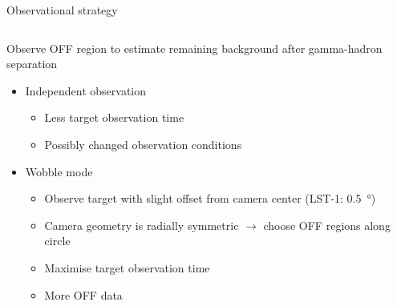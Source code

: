 \begin{frame}{Observational strategy}
    \begin{columns}[onlytextwidth]
        \begin{column}{0.6\textwidth}
            Observe OFF region to estimate remaining background after gamma-hadron separation
            \begin{itemize}
                \item<1-> Independent observation
                    \begin{itemize}
                        \item[\textbf{\textcolor{tugreen}{\to}}] Less target observation time
                        \item[\textbf{\textcolor{tugreen}{\to}}] Possibly changed observation conditions
                    \end{itemize}
                \item<2-> Wobble mode
                    \begin{itemize}
                        \item Observe target with slight offset from camera center (LST-1: \SI{0.5}{\degree})
                        \item Camera geometry is radially symmetric $\to$ choose OFF regions along circle
                        \item[\textbf{\textcolor{tugreen}{\to}}] Maximise target observation time
                        \item[\textbf{\textcolor{tugreen}{\to}}] More OFF data
                    \end{itemize}
            \end{itemize}
        \end{column}
        \begin{column}{0.4\textwidth}
        \end{column}
    \end{columns}


\end{frame}
